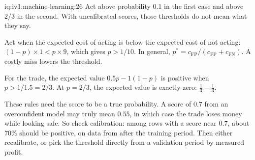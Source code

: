 \begin{solution}{iq:iv1:machine-learning:26}
Act above probability $0.1$ in the first case and above $2/3$ in the second. With uncalibrated scores, those thresholds do not mean what they say.

Act when the expected cost of acting is below the expected cost of not acting: $(1 - p) \times 1 < p \times 9$, which gives $p > 1/10$. In general, $p^* = c_{\text{FP}}/(c_{\text{FP}} + c_{\text{FN}})$. A costly miss lowers the threshold.

For the trade, the expected value $0.5p - 1(1 - p)$ is positive when $p > 1/1.5 = 2/3$. At $p = 2/3$, the expected value is exactly zero: $\frac13 - \frac13$.

These rules need the score to be a true probability. A score of $0.7$ from an overconfident model may truly mean $0.55$, in which case the trade loses money while looking safe. So check calibration: among rows with a score near $0.7$, about 70\% should be positive, on data from after the training period. Then either recalibrate, or pick the threshold directly from a validation period by measured profit.



\end{solution}

